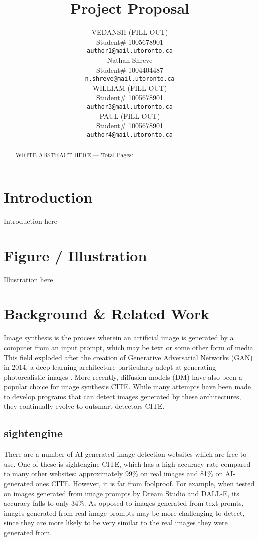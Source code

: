 \documentclass{article} %
\title{Project Proposal}
\author{VEDANSH (FILL OUT)  \\
Student\# 1005678901 \\
\texttt{author1@mail.utoronto.ca} \\
\And
Nathan Shreve  \\
Student\# 1004404487 \\
\texttt{n.shreve@mail.utoronto.ca} \\
\AND
WILLIAM (FILL OUT)  \\
Student\# 1005678901 \\
\texttt{author3@mail.utoronto.ca} \\
\And
PAUL (FILL OUT) \\
Student\# 1005678901 \\
\texttt{author4@mail.utoronto.ca} \\
\AND
}
\begin{document}
\maketitle

\begin{abstract}
WRITE ABSTRACT HERE
----Total Pages: \pageref{last_page}
\end{abstract}



\section{Introduction}
\label{intro}

Introduction here

\section{Figure / Illustration}
\label{illustration}

Illustration here

\section{Background \& Related Work}
\label{background}

Image synthesis is the process wherein an artificial image is generated by a computer from an input prompt, which may be text or some other form of media. This field exploded after the creation of Generative Adversarial Networks (GAN) in 2014, a deep learning architecture particularly adept at generating photorealistic images \citep{GANfather}. More recently, diffusion models (DM) have also been a popular choice for image synthesis CITE. While many attempts have been made to develop programs that can detect images generated by these architectures, they continually evolve to outsmart detectors CITE.

\subsection{sightengine}

There are a number of AI-generated image detection websites which are free to use. One of these is sightengine CITE, which has a high accuracy rate compared to many other websites: approximately 99\% on real images and 81\% on AI-generated ones CITE. However, it is far from foolproof. For example, when tested on images generated from image prompts by Dream Studio and DALL-E, its accuracy falls to only 34\%. As opposed to images generated from text promts, images generated from real image prompts may be more challenging to detect, since they are more likely to be very similar to the real images they were generated from.
\end{document}
